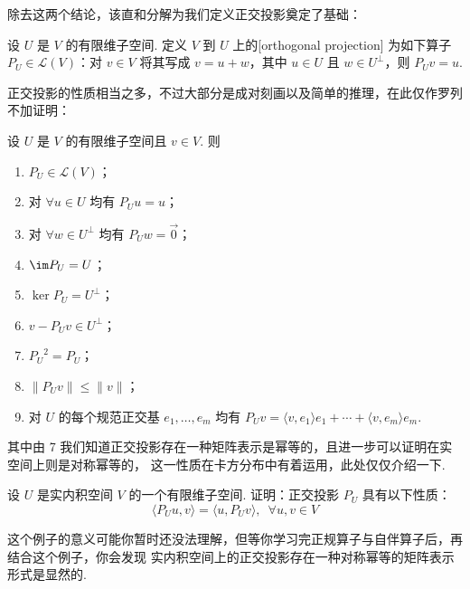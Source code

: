 除去这两个结论，该直和分解为我们定义正交投影奠定了基础：
\begin{definition}
    设 $ U $ 是 $ V $ 的有限维子空间. 定义 $ V $ 到 $ U $ 上的[orthogonal projection]
    为如下算子$ P_U \in \mathcal{L} (V)$：对 $ v \in V $ 将其写成 $ v = u + w $，其中
    $ u \in U $ 且 $ w \in U^{\perp }$，则 $ P_U v = u $.
\end{definition}

正交投影的性质相当之多，不过大部分是成对刻画以及简单的推理，在此仅作罗列不加证明：

设 $ U $ 是 $ V $ 的有限维子空间且 $ v \in V$. 则
\begin{enumerate}
    \item $ P_U \in \mathcal{L} (V) $；

    \item 对 $ \forall u \in U$ 均有 $ P_U u = u $；

    \item 对 $ \forall w \in U^{\perp}$ 均有 $ P_U w = \vec{0} $；

    \item $ \im P_U = U$；

    \item $ \ker P_U = U^{\perp}$；

    \item $ v - P_U v \in U^{\perp}$；

    \item $ {P_U}^{2} = P_U$；

    \item $ \lVert P_U v\rVert \leqslant \lVert v \rVert $；

    \item 对 $ U $ 的每个规范正交基 $e_1, \ldots , e_m$ 均有 $ P_U v = \langle v, e_1 \rangle e_1 + \cdots + \langle v, e_m \rangle e_m$.
\end{enumerate}
其中由 7 我们知道正交投影存在一种矩阵表示是幂等的，且进一步可以证明在实空间上则是对称幂等的，
这一性质在卡方分布中有着运用，此处仅仅介绍一下.

\begin{example}
    设 $ U $ 是实内积空间 $ V $ 的一个有限维子空间. 证明：正交投影 $ P_U $ 具有以下性质：
    \[\langle P_U u, v\rangle = \langle u, P_U v\rangle, \enspace \forall u, v \in V \]
\end{example}

这个例子的意义可能你暂时还没法理解，但等你学习完正规算子与自伴算子后，再结合这个例子，你会发现
实内积空间上的正交投影存在一种对称幂等的矩阵表示形式是显然的.


